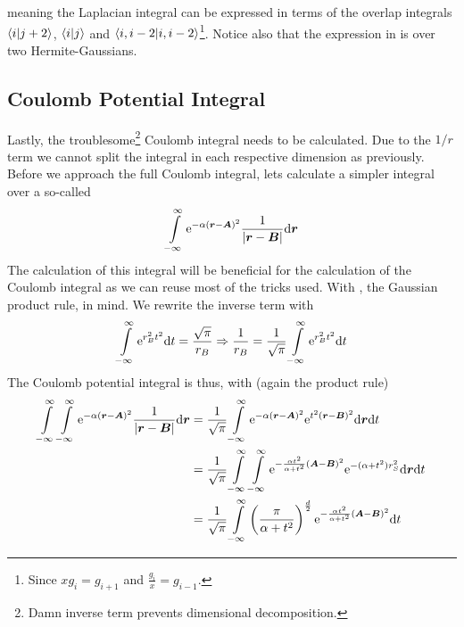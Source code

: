     meaning the Laplacian integral can be expressed in terms of the overlap
    integrals $\braket{i}{j+2}$, $\braket{i}{j}$ and
    $\braket{i,i-2}$\footnote{Since $xg_i=g_{i+1}$ and
    $\frac{g_i}{x}=g_{i-1}$.}. Notice also that the expression in
     is over two Hermite-Gaussians.

\subsection{Coulomb Potential Integral}
    Lastly, the troublesome\footnote{Damn inverse term prevents dimensional
    decomposition.} Coulomb integral needs to be calculated. Due to the $1/r$
    term we cannot split the integral in each respective dimension as
    previously. Before we approach the full Coulomb integral, lets calculate a
    simpler integral over a so-called 
        \begin{equation}
            \int\limits^{\infty}_{-\infty} \mathrm{e}^{-\alpha\left(\boldsymbol{{r}} - \boldsymbol{{A}}\right)^2}
            \frac{1}{\abs{\boldsymbol{{r}} - \boldsymbol{{B}}}} \mathrm{d}\boldsymbol{{r}}
        \end{equation}
    The calculation of this integral will be beneficial for the calculation of
    the Coulomb integral as we can reuse most of the tricks used. With
    , the Gaussian product rule, in mind. We
    rewrite the inverse term with
        \begin{equation}
            \int\limits^{\infty}_{-\infty} \mathrm{e}^{r^2_B t^2} \mathrm{d} t = \frac{\sqrt{\pi}}{r_B} \Rightarrow
            \frac{1}{r_B} = \frac{1}{\sqrt{\pi}} \int\limits^{\infty}_{-\infty} \mathrm{e}^{r^2_Bt^2} \mathrm{d} t
            \label{eq:onelectronTrick1}
        \end{equation}
    The Coulomb potential integral is thus, with
    (again the product rule)
        \begin{align}
            \int\limits^{\infty}_{-\infty}\int\limits^{\infty}_{-\infty} \mathrm{e}^{-\alpha\left(\boldsymbol{{r}} - \boldsymbol{{A}}\right)^2}
            \frac{1}{\abs{\boldsymbol{{r}} - \boldsymbol{{B}}}} \mathrm{d}\boldsymbol{{r}} &=
            \frac{1}{\sqrt{\pi}}\int\limits^{\infty}_{-\infty} \mathrm{e}^{-\alpha\left(\boldsymbol{{r}} -
            \boldsymbol{{A}}\right)^2} \mathrm{e}^{t^2(\boldsymbol{{r}} - \boldsymbol{{B}})^2} \mathrm{d}\boldsymbol{{r}} \mathrm{d}
            t \nonumber \\
            &= \frac{1}{\sqrt{\pi}} \int\limits^{\infty}_{-\infty}\int\limits^{\infty}_{-\infty} \mathrm{e}^{-\frac{\alpha
            t^2}{\alpha + t^2}\left(\boldsymbol{{A}} - \boldsymbol{{B}}\right)^2}
            \mathrm{e}^{-(\alpha+t^2)r^2_S} \mathrm{d}\boldsymbol{{r}} \mathrm{d} t \nonumber \\
            &= \frac{1}{\sqrt{\pi}} \int\limits^{\infty}_{-\infty} \left(\frac{\pi}{\alpha +
            t^2}\right)^{\frac{d}{2}} \mathrm{e}^{-\frac{\alpha t^2}{\alpha +
            t^2}\left(\boldsymbol{{A}} - \boldsymbol{{B}}\right)^2} \mathrm{d} t
        \end{align}
